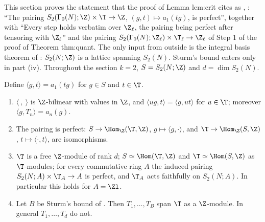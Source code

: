 This section proves the statement that the proof of Lemma lem:crit cites as \cite[Theorem 2.2]{Ribet83}, \cite[Lemma 2.1]{AU96}: ``The pairing $S_2(\Gamma_0(N);\Z)\times\T\to\Z$,
$(g,t)\mapsto a_1(tg)$, is perfect'', together with ``Every step holds verbatim over $\Z_\ell$, the pairing being perfect after tensoring with $\Z_\ell$'' and the pairing
$S_2(\Gamma_0(N);\Z_\ell)\times\T_\ell\to\Z_\ell$ of Step 1 of the proof of Theorem thm:quant. The only input from outside is the integral basis theorem of : $S_2(N;\Z)$
is a lattice spanning $S_2(N)$. Sturm's bound enters only in part (iv). Throughout the section $k=2$, $S=S_2(N;\Z)$ and $d=\dim S_2(N)$.

\begin{theorem}\label{thm:hecke:perfect-pairing}
Define $\langle g,t\rangle=a_1(tg)$ for $g\in S$ and $t\in\T$.
\begin{enumerate}[label=(\roman*)]
\item $\langle\ ,\ \rangle$ is $\Z$-bilinear with values in $\Z$, and $\langle ug,t\rangle=\langle g,ut\rangle$ for $u\in\T$; moreover $\langle g,T_n\rangle=a_n(g)$.
\item The pairing is perfect: $S\to\Hom_\Z(\T,\Z)$, $g\mapsto\langle g,\cdot\rangle$, and $\T\to\Hom_\Z(S,\Z)$, $t\mapsto\langle\cdot,t\rangle$, are isomorphisms.
\item $\T$ is a free $\Z$-module of rank $d$; $S\simeq\Hom(\T,\Z)$ and $\T\simeq\Hom(S,\Z)$ as $\T$-modules; for every commutative ring $A$ the induced pairing $S_2(N;A)\times\T_A\to A$
is perfect, and $\T_A$ acts faithfully on $S_2(N;A)$. In particular this holds for $A=\Zl$.
\item Let $B$ be Sturm's bound of . Then $T_1,\dots,T_B$ span $\T$ as a $\Z$-module. In general $T_1,\dots,T_d$ do not.
\end{enumerate}
\end{theorem}

